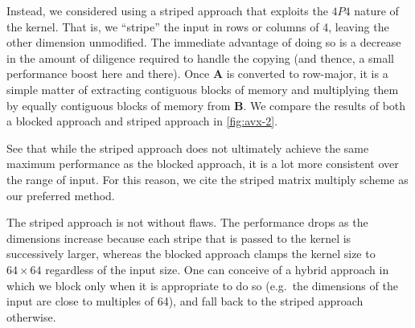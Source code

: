 \documentclass{scrartcl}
\begin{document}
  Instead, we considered using a striped approach that exploits the $4P4$ nature of the kernel. That is, we ``stripe'' the input in rows or columns of 4, leaving the other dimension unmodified.  The immediate advantage of doing so is a decrease in the amount of diligence required to handle the copying (and thence, a small performance boost here and there). Once $\mathbf{A}$ is converted to row-major, it is a simple matter of extracting contiguous blocks of memory and multiplying them by equally contiguous blocks of memory from $\mathbf{B}$. We compare the results of both a blocked approach and striped approach in \autoref{fig:avx-2}.

  See that while the striped approach does not ultimately achieve the same maximum performance as the blocked approach, it is a lot more consistent over the range of input. For this reason, we cite the striped matrix multiply scheme as our preferred method.

  The striped approach is not without flaws. The performance drops as the dimensions increase because each stripe that is passed to the kernel is successively larger, whereas the blocked approach clamps the kernel size to $64 \times 64$ regardless of the input size. One can conceive of a hybrid approach in which we block only when it is appropriate to do so (e.g.~the dimensions of the input are close to multiples of 64), and fall back to the striped approach otherwise.
\end{document}
